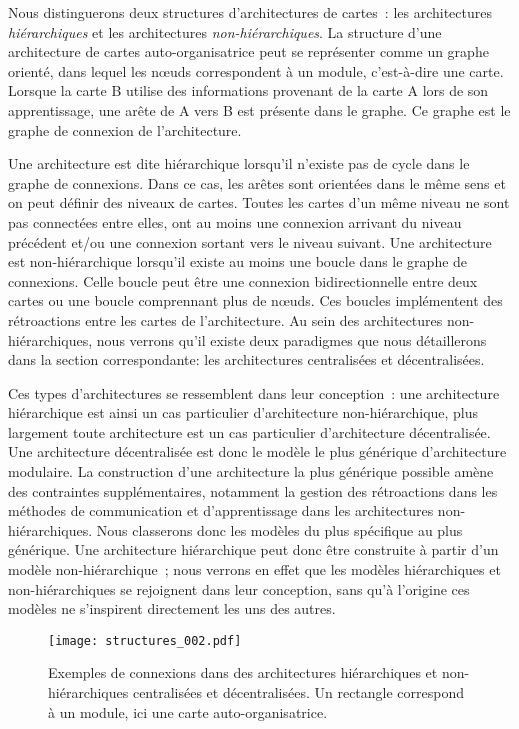 \documentclass[../main]{subfiles}
\begin{document}
Nous distinguerons deux structures d'architectures de cartes~: les architectures \emph{hiérarchiques} et  les architectures \emph{non-hiérarchiques}.
La structure d'une architecture de cartes auto-organisatrice peut se représenter comme un graphe orienté, dans lequel les n\oe{}uds correspondent à un module, c'est-à-dire une carte. Lorsque la carte B utilise des informations provenant de la carte A lors de son apprentissage, une arête de A vers B est présente dans le graphe. Ce graphe est le graphe de connexion de l'architecture.

Une architecture est dite hiérarchique lorsqu'il n'existe pas de cycle dans le graphe de connexions. Dans ce cas, les arêtes sont orientées dans le même sens et on peut définir des niveaux de cartes. Toutes les cartes d'un même niveau ne sont pas connectées entre elles, ont au moins une connexion arrivant du niveau précédent et/ou une connexion sortant vers le niveau suivant.
Une architecture est non-hiérarchique lorsqu'il existe au moins une boucle dans le graphe de connexions. Celle boucle peut être une connexion bidirectionnelle entre deux cartes ou une boucle comprennant plus de n\oe{}uds. Ces boucles implémentent des rétroactions entre les cartes de l'architecture.
Au sein des architectures non-hiérarchiques, nous verrons qu'il existe deux paradigmes que nous détaillerons dans la section correspondante: les architectures centralisées et décentralisées.


Ces types d'architectures se ressemblent dans leur conception~: une architecture hiérarchique est ainsi un cas particulier d'architecture non-hiérarchique, plus largement toute architecture est un cas particulier d'architecture décentralisée. Une architecture décentralisée est donc le modèle le plus générique d'architecture modulaire. 
La construction d'une architecture la plus générique possible amène des contraintes supplémentaires, notamment la gestion des rétroactions dans les méthodes de communication et d'apprentissage dans les architectures non-hiérarchiques. Nous classerons donc les modèles du plus spécifique au plus générique. Une architecture hiérarchique peut donc être construite à partir d'un modèle non-hiérarchique~; nous verrons en effet que les modèles hiérarchiques et non-hiérarchiques se rejoignent dans leur conception, sans qu'à l'origine ces modèles ne s'inspirent directement les uns des autres.

\begin{figure}
    \centering\texttt{[image: structures\_002.pdf]}
    \caption{Exemples de connexions dans des architectures hiérarchiques et non-hiérarchiques centralisées et décentralisées. Un rectangle correspond à un module, ici une carte auto-organisatrice. \label{fig:graphe}}
    \end{figure}
\end{document}
